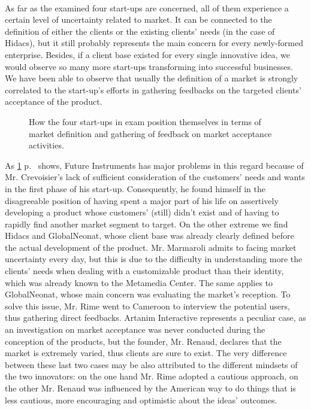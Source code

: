 \documentclass[twoside]{report}
\begin{document}
\paragraph{}
As far as the examined four start-ups are concerned, all of them experience a certain level of uncertainty related to market. It can be connected to the definition of either the clients or the existing clients' needs (in the case of Hidacs), but it still probably represents the main concern for every newly-formed enterprise. Besides, if a client base existed for every single innovative idea, we would observe so many more start-ups transforming into successful businesses. 
We have been able to observe that usually the definition of a market is strongly correlated to the start-up's efforts in gathering feedbacks on the targeted clients' acceptance of the product.
\begin{figure}
\begin{center}
\caption{How the four start-ups in exam position themselves in terms of market definition and gathering of feedback on market acceptance activities.}
\label{fig:position}
\end{center}
\end{figure}
As \ref{fig:position} p.~\pageref{fig:position} shows, Future Instruments has major problems in this regard because of Mr. Crevoisier's lack of sufficient consideration of the customers' needs and wants in the first phase of his start-up. Consequently, he found himself in the disagreeable position of having spent a major part of his life on assertively developing a product whose customers' (still) didn't exist and of having to rapidly find another market segment to target. On the other extreme we find Hidacs and GlobalNeonat, whose client base was already clearly defined before the actual development of the product. Mr. Marmaroli admits to facing market uncertainty every day, but this is due to the difficulty in understanding more the clients' needs when dealing with a customizable product than their identity, which was already known to the Metamedia Center. The same applies to GlobalNeonat, whose main concern was evaluating the market's reception. To solve this issue, Mr. Rime went to Cameroon to interview the potential users, thus gathering direct feedbacks. Artanim Interactive represents a peculiar case, as an investigation on market acceptance was never conducted during the conception of the products, but the founder, Mr. Renaud, declares that the market is extremely varied, thus clients are sure to exist. The very difference between these last two cases may be also attributed to the different mindsets of the two innovators: on the one hand Mr. Rime adopted a cautious approach, on the other Mr. Renaud was influenced by the American way to do things that is less cautious, more encouraging and optimistic about the ideas' outcomes. 
\end{document}
